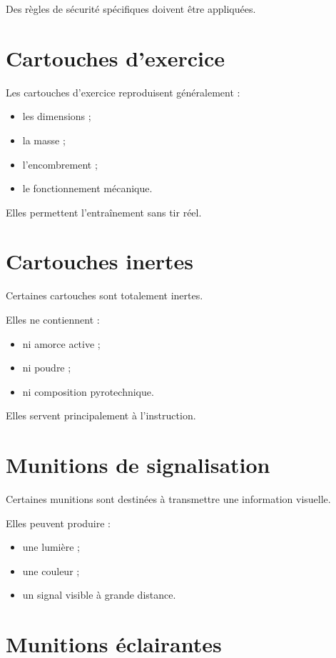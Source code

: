 Des règles de sécurité spécifiques doivent être appliquées.

\section{Cartouches d'exercice}

Les cartouches d'exercice reproduisent généralement :

\begin{itemize}
    \item les dimensions ;
    \item la masse ;
    \item l'encombrement ;
    \item le fonctionnement mécanique.
\end{itemize}

Elles permettent l'entraînement sans tir réel.

\section{Cartouches inertes}

Certaines cartouches sont totalement inertes.

Elles ne contiennent :

\begin{itemize}
    \item ni amorce active ;
    \item ni poudre ;
    \item ni composition pyrotechnique.
\end{itemize}

Elles servent principalement à l'instruction.

\section{Munitions de signalisation}

Certaines munitions sont destinées à transmettre une information visuelle.

Elles peuvent produire :

\begin{itemize}
    \item une lumière ;
    \item une couleur ;
    \item un signal visible à grande distance.
\end{itemize}

\section{Munitions éclairantes}


